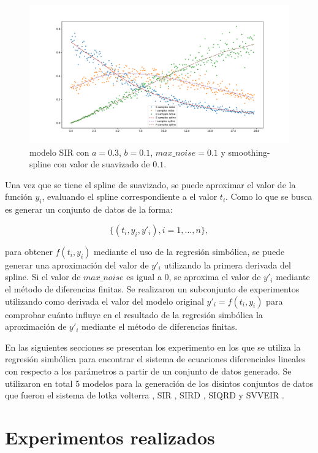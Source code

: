 \begin{figure}[h]
    \centering
    \includegraphics[width=\textwidth]{"figures/SIR_noise_with_spline.pdf"}
    \caption{modelo SIR con $a = 0.3$, $b = 0.1$, $max\_noise = 0.1$ y smoothing-spline con valor de suavizado de $0.1$.}
    \label{fig:SIR_noise_with_spline}
\end{figure}

Una vez que se tiene el spline de suavizado, se puede aproximar el valor de la función $y_i$, evaluando el spline correspondiente a el valor $t_i$. Como lo que se busca es generar un conjunto de datos de la forma:

$$\{(t_i, y_i, y'_i), i=1, \dots, n\},$$

para obtener $f(t_i, y_i)$ mediante el uso de la regresión simbólica, se puede generar una aproximación del valor de $y'_i$ utilizando la primera derivada del spline. Si el valor de $max\_noise$ es igual a 0, se aproxima el valor de $y'_i$ mediante el método de diferencias finitas. Se realizaron un subconjunto de experimentos utilizando como derivada el valor del modelo original $y'_i = f(t_i, y_i)$ para comprobar cuánto influye en el resultado de la regresión simbólica la aproximación de $y'_i$ mediante el método de diferencias finitas.

En las siguientes secciones se presentan los experimento en los que se utiliza la regresión simbólica para encontrar el sistema de ecuaciones diferenciales lineales con respecto a los parámetros a partir de un conjunto de datos generado. Se utilizaron en total 5 modelos para la generación de los disintos conjuntos de datos que fueron el sistema de lotka volterra \cite{Hoppensteadt:2006}, SIR \cite{weiss2013sir}, SIRD \cite{bailey1975mathematical}, SIQRD \cite{molter2021mathematical} y SVVEIR \cite{kuddus2021mathematical}.

\section{Experimentos realizados}\label{section:experiments}

